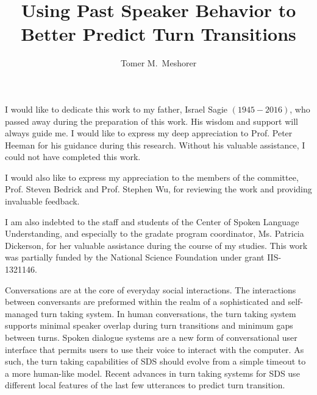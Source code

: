 \documentclass[copyright,masters]{cslu-thesis}
\begin{document}
\title{Using Past Speaker Behavior to Better Predict Turn Transitions}
\author{Tomer M.\ Meshorer}


\frontmatter


I would like to dedicate this work to my father, Israel Sagie $(1945-2016)$, who passed away during the preparation of this work.
His wisdom and support will always guide me.
I would like to express my deep appreciation to Prof. Peter Heeman for his guidance during this research. Without his valuable assistance,
I could not have completed this work.

I would also like to express my appreciation to the members of the committee, Prof. Steven Bedrick and Prof. Stephen Wu, for reviewing
the work and providing invaluable feedback.

I am also indebted to the staff and students of the Center of Spoken Language Understanding, and especially to the gradate program coordinator, Ms. Patricia Dickerson,
for her valuable assistance during the course of my studies.
This work was partially funded by the National Science Foundation under grant IIS-1321146.


\tableofcontents


\abstract
 Conversations are at the core of everyday social interactions. The interactions between conversants are preformed within the realm of a sophisticated and self-managed turn taking system. In human conversations, the turn taking system  supports minimal speaker overlap during turn transitions and minimum gaps between turns. Spoken dialogue systems are a new form of conversational user interface that permits users to use their voice to interact with the computer. As such, the turn taking capabilities of SDS should evolve from a simple timeout to a more human-like model. Recent advances in turn taking systems for SDS use different local features of the last few utterances to predict turn transition.
\end{document}
